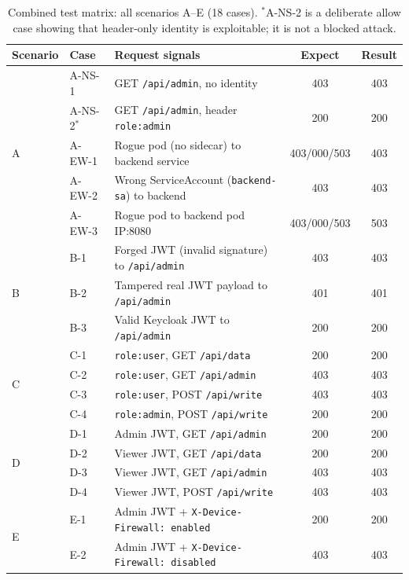 \documentclass[conference]{IEEEtran}
\begin{document}
\begin{table}[!t]
\caption{Combined test matrix: all scenarios A--E (18 cases). $^{*}$A-NS-2 is a deliberate allow case showing that header-only identity is exploitable; it is not a blocked attack.}
\label{tab:allcases}
\centering
\scriptsize
\begin{tabularx}{\columnwidth}{l l >{\raggedright\arraybackslash}X c c}
\toprule
Scenario & Case & Request signals & Expect & Result \\
\midrule
\multirow{5}{*}{A}
  & A-NS-1 & GET \texttt{/api/admin}, no identity & 403 & 403 \\
  & A-NS-2$^{*}$ & GET \texttt{/api/admin}, header \texttt{role:admin} & 200 & 200 \\
  & A-EW-1 & Rogue pod (no sidecar) to backend service & 403/000/503 & 403 \\
  & A-EW-2 & Wrong ServiceAccount (\texttt{backend-sa}) to backend & 403 & 403 \\
  & A-EW-3 & Rogue pod to backend pod IP:8080 & 403/000/503 & 503 \\
\midrule
\multirow{3}{*}{B}
  & B-1 & Forged JWT (invalid signature) to \texttt{/api/admin} & 403 & 403 \\
  & B-2 & Tampered real JWT payload to \texttt{/api/admin} & 401 & 401 \\
  & B-3 & Valid Keycloak JWT to \texttt{/api/admin} & 200 & 200 \\
\midrule
\multirow{4}{*}{C}
  & C-1 & \texttt{role:user}, GET \texttt{/api/data} & 200 & 200 \\
  & C-2 & \texttt{role:user}, GET \texttt{/api/admin} & 403 & 403 \\
  & C-3 & \texttt{role:user}, POST \texttt{/api/write} & 403 & 403 \\
  & C-4 & \texttt{role:admin}, POST \texttt{/api/write} & 200 & 200 \\
\midrule
\multirow{4}{*}{D}
  & D-1 & Admin JWT, GET \texttt{/api/admin} & 200 & 200 \\
  & D-2 & Viewer JWT, GET \texttt{/api/data} & 200 & 200 \\
  & D-3 & Viewer JWT, GET \texttt{/api/admin} & 403 & 403 \\
  & D-4 & Viewer JWT, POST \texttt{/api/write} & 403 & 403 \\
\midrule
\multirow{2}{*}{E}
  & E-1 & Admin JWT + \texttt{X-Device-Firewall: enabled} & 200 & 200 \\
  & E-2 & Admin JWT + \texttt{X-Device-Firewall: disabled} & 403 & 403 \\
\bottomrule
\end{tabularx}
\end{table}
\end{document}
